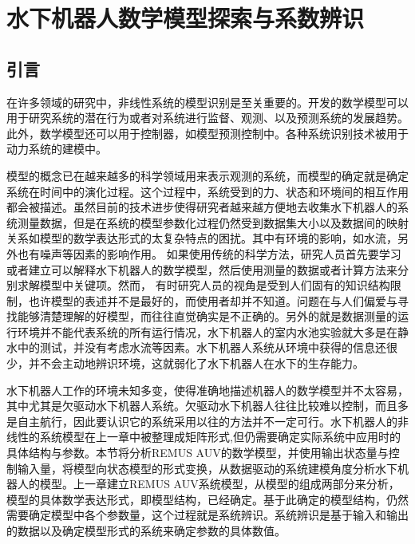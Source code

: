 
\chapter{水下机器人数学模型探索与系数辨识 }

\label{chap:system_discovery}
\section{引言}

在许多领域的研究中，非线性系统的模型识别是至关重要的\cite{kim2012estimating}。开发的数学模型可以用于研究系统的潜在行为或者对系统进行监督、观测、以及预测系统的发展趋势。此外，数学模型还可以用于控制器，如模型预测控制中。各种系统识别技术被用于动力系统的建模中。

模型的概念已在越来越多的科学领域用来表示观测的系统，而模型的确定就是确定系统在时间中的演化过程\cite{wu2016parametric}。这个过程中，系统受到的力、状态和环境间的相互作用都会被描述。虽然目前的技术进步使得研究者越来越方便地去收集水下机器人的系统测量数据，但是在系统的模型参数化过程仍然受到数据集大小以及数据间的映射关系如模型的数学表达形式的太复杂特点的困扰\cite{menezes2014symbolic,wu2016parametric}。其中有环境的影响，如水流，另外也有噪声等因素的影响作用。
如果使用传统的科学方法，研究人员首先要学习或者建立可以解释水下机器人的数学模型，然后使用测量的数据或者计算方法来分别求解模型中关键项\cite{yang2014modeling,huang2015trends}。然而，
有时研究人员的视角是受到人们固有的知识结构限制，也许模型的表述并不是最好的，而使用者却并不知道。问题在与人们偏爱与寻找能够清楚理解的好模型，而往往直觉确实是不正确的。另外的就是数据测量的运行环境并不能代表系统的所有运行情况，水下机器人的室内水池实验就大多是在静水中的测试，并没有考虑水流等因素。水下机器人系统从环境中获得的信息还很少，并不会主动地辨识环境，这就弱化了水下机器人在水下的生存能力。

水下机器人工作的环境未知多变，使得准确地描述机器人的数学模型并不太容易，其中尤其是欠驱动水下机器人系统。欠驱动水下机器人往往比较难以控制，而且多是自主航行，因此要认识它的系统采用以往的方法并不一定可行。水下机器人的非线性的系统模型在上一章中被整理成矩阵形式,但仍需要确定实际系统中应用时的具体结构与参数\cite{garcia2014modelling,Tang2009Estimation,yang2014modeling}。本节将分析REMUS AUV的数学模型，并使用输出状态量与控制输入量，将模型向状态模型的形式变换，从数据驱动的系统建模角度分析水下机器人的模型\cite{brunton2016discovering,schmidt2009distilling}。上一章建立REMUS AUV系统模型，从模型的组成两部分来分析，模型的具体数学表达形式，即模型结构，已经确定。基于此确定的模型结构，仍然需要确定模型中各个参数量，这个过程就是系统辨识\cite{eng2014added}。系统辨识是基于输入和输出的数据以及确定模型形式的系统来确定参数的具体数值。

